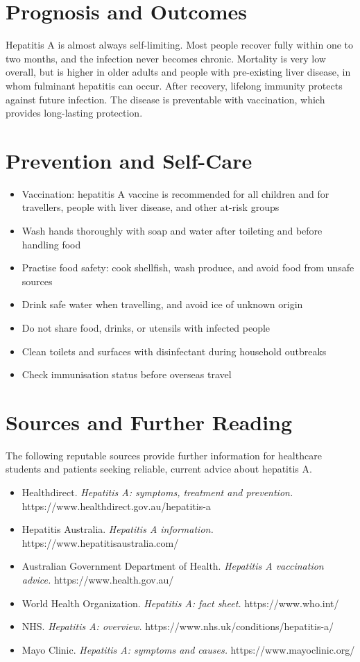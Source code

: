 \section*{Prognosis and Outcomes}
Hepatitis A is almost always self-limiting. Most people recover fully within one to two months, and the infection never becomes chronic. Mortality is very low overall, but is higher in older adults and people with pre-existing liver disease, in whom fulminant hepatitis can occur. After recovery, lifelong immunity protects against future infection. The disease is preventable with vaccination, which provides long-lasting protection.

\section*{Prevention and Self-Care}
\begin{itemize}
    \item Vaccination: hepatitis A vaccine is recommended for all children and for travellers, people with liver disease, and other at-risk groups
    \item Wash hands thoroughly with soap and water after toileting and before handling food
    \item Practise food safety: cook shellfish, wash produce, and avoid food from unsafe sources
    \item Drink safe water when travelling, and avoid ice of unknown origin
    \item Do not share food, drinks, or utensils with infected people
    \item Clean toilets and surfaces with disinfectant during household outbreaks
    \item Check immunisation status before overseas travel
\end{itemize}

\section*{Sources and Further Reading}
The following reputable sources provide further information for healthcare students and patients seeking reliable, current advice about hepatitis A.

\begin{itemize}
    \item Healthdirect. \textit{Hepatitis A: symptoms, treatment and prevention.} https://www.healthdirect.gov.au/hepatitis-a
    \item Hepatitis Australia. \textit{Hepatitis A information.} https://www.hepatitisaustralia.com/
    \item Australian Government Department of Health. \textit{Hepatitis A vaccination advice.} https://www.health.gov.au/
    \item World Health Organization. \textit{Hepatitis A: fact sheet.} https://www.who.int/
    \item NHS. \textit{Hepatitis A: overview.} https://www.nhs.uk/conditions/hepatitis-a/
    \item Mayo Clinic. \textit{Hepatitis A: symptoms and causes.} https://www.mayoclinic.org/
\end{itemize}
